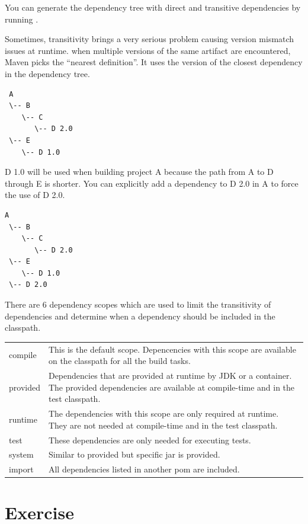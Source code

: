 You can generate the dependency tree with direct and transitive dependencies by running
 .

Sometimes, transitivity brings a very serious problem causing version mismatch issues at runtime.
when multiple versions of the same artifact are encountered, Maven picks the ``nearest definition''. It uses the version of the closest dependency in the dependency tree.

\begin{verbatim}
 A
 \-- B
    \-- C
       \-- D 2.0
 \-- E
    \-- D 1.0
\end{verbatim}

D 1.0 will be used when building project A because the path from A to D through E is shorter. You can explicitly add a dependency to D 2.0 in A to force the use of D 2.0.

\begin{verbatim}
A
 \-- B
    \-- C
       \-- D 2.0
 \-- E
    \-- D 1.0
 \-- D 2.0
 \end{verbatim}

There are 6 dependency scopes which are used to limit the transitivity of dependencies and determine when a dependency should be included in the classpath.

\begin{tabularx}{\textwidth}{ |l|X| } 
 \hline
 compile & 
This is the default scope. Depencencies with this scope are available on the classpath for all the build tasks.\\
provided &
Dependencies that are provided at runtime by JDK or a container. The provided dependencies are available at compile-time and in the test classpath.\\
runtime &
The dependencies with this scope are only required at runtime. They are not needed at compile-time and in the test classpath.\\
test &
These dependencies are only needed for executing tests.\\
system &
Similar to provided but specific jar is provided.\\ 
import &
All dependencies listed in another pom are included.\\
\hline
\end{tabularx}



\section{Exercise}



